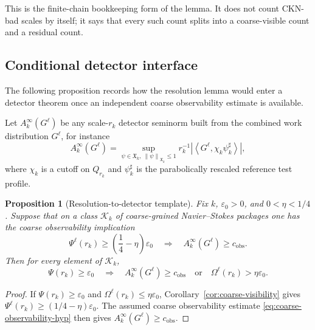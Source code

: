 \documentclass[10pt,a4paper]{amsart}
\numberwithin{equation}{section}
\newtheorem{proposition}[theorem]{Proposition}
\newcommand{\eps}{\varepsilon}
\newcommand{\calK}{\mathcal K}
\newcommand{\norm}[2]{\left\lVert #1\right\rVert_{#2}}
\begin{document}
This is the finite-chain bookkeeping form of the lemma.  It does not count CKN-bad scales by itself; it says that every such count splits into a coarse-visible count and a residual count.

\subsection{Conditional detector interface}

The following proposition records how the resolution lemma would enter a detector theorem once an independent coarse observability estimate is available.

Let $A_k^\infty(G^\ell)$ be any scale-$r_k$ detector seminorm built from the combined work distribution $G^\ell$, for instance
\begin{equation}\label{eq:infinite-detector}
A_k^\infty(G^\ell)=
\sup_{\psi\in\mathfrak X_k,\ \norm{\psi}{\mathfrak X_k}\le1}
 r_k^{-1}\left|\left\langle G^\ell,\chi_k\psi_k^\sharp\right\rangle\right|,
\end{equation}
where $\chi_k$ is a cutoff on $Q_{r_k}$ and $\psi_k^\sharp$ is the parabolically rescaled reference test profile.

\begin{proposition}[Resolution-to-detector template]\label{prop:detector-template}
Fix $k$, $\eps_0>0$, and $0<\eta<1/4$.  Suppose that on a class $\calK_k$ of coarse-grained Navier--Stokes packages one has the coarse observability implication
\begin{equation}\label{eq:coarse-observability-hyp}
\Psi^\ell(r_k)\ge\left(\frac14-\eta\right)\eps_0
\quad\Longrightarrow\quad
A_k^\infty(G^\ell)\ge c_{\mathrm{obs}}.
\end{equation}
Then for every element of $\calK_k$,
\begin{equation}\label{eq:detector-dichotomy-template}
\Psi(r_k)\ge\eps_0
\quad\Longrightarrow\quad
A_k^\infty(G^\ell)\ge c_{\mathrm{obs}}
\quad\text{or}\quad
\Omega^\ell(r_k)>\eta\eps_0.
\end{equation}
\end{proposition}

\begin{proof}
If $\Psi(r_k)\ge\eps_0$ and $\Omega^\ell(r_k)\le\eta\eps_0$, Corollary~\ref{cor:coarse-visibility} gives $\Psi^\ell(r_k)\ge(1/4-\eta)\eps_0$.  The assumed coarse observability estimate \eqref{eq:coarse-observability-hyp} then gives $A_k^\infty(G^\ell)\ge c_{\mathrm{obs}}$.
\end{proof}
\end{document}
